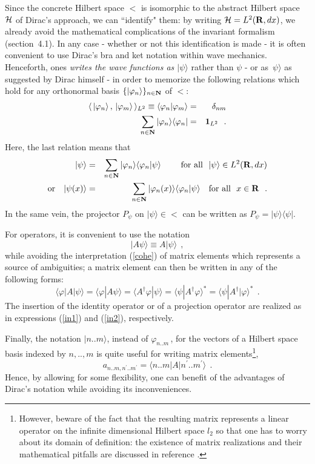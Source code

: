 \documentclass[12pt]{report}
\begin{document}
Since the concrete Hilbert space $\lt$ is isomorphic to the 
abstract Hilbert space ${\cal H}$
of Dirac's approach, we can 
``identify" them: by writing  
${\cal H} = {L^2 ({{\bf R}},dx)}$, we already avoid the mathematical 
complications of the invariant formalism (section~4.1). 
In any case - whether or not this identification is made - 
it is often convenient to use Dirac's bra and ket notation 
within wave mechanics. Henceforth, ones 
{\em writes the wave functions as $| \psi \rangle$}
rather than $\psi$
- or as $\, \psi \rangle$ as suggested by Dirac 
himself \cite{d} 
- in order to memorize the following relations which hold for any
orthonormal basis 
$\{ | \varphi_n \rangle \}_{n\in {\bf N}}$ of $\lt$:
\begin{eqnarray*}
\langle \, |\varphi_n \rangle \, ,\, |\varphi_m \rangle \, \rangle _{L^2}
\equiv
\langle \varphi_n  | \varphi_m \rangle & = & \delta_{nm}
\\
\sum_{n \in {\bf N}}
| \varphi_n \rangle \langle \varphi_n | & = & {\bf 1}_{L^2}
\ \ .
\end{eqnarray*}
Here, the last relation means that 
\begin{eqnarray*}
|\psi \rangle & = &
\sum_{n \in {\bf N}}
| \varphi_n \rangle \langle \varphi_n | \psi \rangle
\qquad  \ \mbox{for all} \ \  | \psi \rangle \in {L^2 ({{\bf R}},dx)}
\\
\mbox{or} \quad
| \psi (x) \rangle & = &
\sum_{n \in {\bf N}}
| \varphi_n (x) \rangle \langle \varphi_n | \psi \rangle
\quad \mbox{for all} \ \  x \in {\bf R}
\ \ .
\end{eqnarray*}
In the same vein, the projector 
$P_{\psi}$ on 
$| \psi \rangle \in \lt$ 
can be written as 
$P_{\psi} = | \psi \rangle \langle \psi |$.
 
For operators, it is convenient to use the notation \cite{ct}
\[
| A \psi \rangle \equiv A | \psi \rangle
\ \ ,
\]
while avoiding the interpretation (\ref{cohe}) of matrix elements 
which represents a source of ambiguities; 
a matrix element can then be written 
in any of the following forms:
\[
\langle \varphi | A | \psi \rangle  =
\langle \varphi | A  \psi \rangle  =
\langle A^{\dag} \varphi | \psi \rangle =
\langle \psi | A^{\dag} \varphi \rangle ^{\ast} =
\langle \psi | A^{\dag} | \varphi \rangle ^{\ast}
\ \ .
\]
The insertion of the identity operator 
or of a projection operator 
are realized as in  
expressions (\ref{in1}) and (\ref{in2}), respectively.
 
Finally, the 
notation $|n..m \rangle$, instead of $\varphi_{n..m}\,$, for 
the vectors of a Hilbert space basis indexed by $n,..,m$
is quite useful for writing matrix elements\footnote{However, 
beware of the fact
that the resulting matrix represents a linear operator on the 
infinite dimensional Hilbert space $l_2$ so that 
one has to worry about its domain of definition:
the existence of matrix realizations and their mathematical pitfalls
are discussed in reference \cite{sg}.},  
\[
a_{n..m,n^{\prime} .. m^{\prime}} =
\langle n..m | A |
n^{\prime} .. m^{\prime} \rangle
\ \ .
\]
Hence, by allowing for some flexibility, 
one can benefit of the advantages of Dirac's notation 
while avoiding its inconveniences. 
\end{document}
